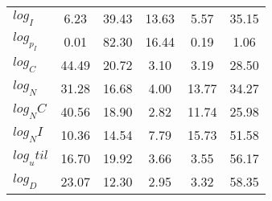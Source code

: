 \begin{center}
\begin{longtable}{lccccc}
$log_I     $	 & 	        6.23	 & 	       39.43	 & 	       13.63	 & 	        5.57	 & 	       35.15 \\ 
$log_p_I   $	 & 	        0.01	 & 	       82.30	 & 	       16.44	 & 	        0.19	 & 	        1.06 \\ 
$log_C     $	 & 	       44.49	 & 	       20.72	 & 	        3.10	 & 	        3.19	 & 	       28.50 \\ 
$log_N     $	 & 	       31.28	 & 	       16.68	 & 	        4.00	 & 	       13.77	 & 	       34.27 \\ 
$log_NC    $	 & 	       40.56	 & 	       18.90	 & 	        2.82	 & 	       11.74	 & 	       25.98 \\ 
$log_NI    $	 & 	       10.36	 & 	       14.54	 & 	        7.79	 & 	       15.73	 & 	       51.58 \\ 
$log_util  $	 & 	       16.70	 & 	       19.92	 & 	        3.66	 & 	        3.55	 & 	       56.17 \\ 
$log_D     $	 & 	       23.07	 & 	       12.30	 & 	        2.95	 & 	        3.32	 & 	       58.35 \\ 
\end{longtable}
 \end{center}
